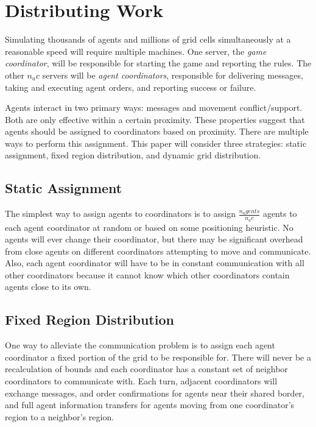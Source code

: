 \section{Distributing Work}

Simulating thousands of agents and millions of grid cells simultaneously at a reasonable speed will require multiple machines. One server, the \emph{game coordinator}, will be responsible for starting the game and reporting the rules. The other $n_ac$ servers will be \emph{agent coordinators}, responsible for delivering messages, taking and executing agent orders, and reporting success or failure.

Agents interact in two primary ways: messages and movement conflict/support. Both are only effective within a certain proximity. These properties suggest that agents should be assigned to coordinators based on proximity. There are multiple ways to perform this assignment. This paper will consider three strategies: static assignment, fixed region distribution, and dynamic grid distribution.

\subsection{Static Assignment}

The simplest way to assign agents to coordinators is to assign $\frac{n_agents}{n_ac}$ agents to each agent coordinator at random or based on some positioning heuristic. No agents will ever change their coordinator, but there may be significant overhead from close agents on different coordinators attempting to move and communicate. Also, each agent coordinator will have to be in constant communication with all other coordinators because it cannot know which other coordinators contain agents close to its own.

\subsection{Fixed Region Distribution}

One way to alleviate the communication problem is to assign each agent coordinator a fixed portion of the grid to be responsible for. There will never be a recalculation of bounds and each coordinator has a constant set of neighbor coordinators to communicate with. Each turn, adjacent coordinators will exchange messages, and order confirmations for agents near their shared border, and full agent information transfers for agents moving from one coordinator's region to a neighbor's region.

